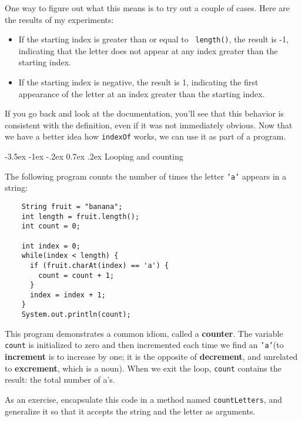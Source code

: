 \documentclass{book}
\makeatletter
\renewcommand{\section}{\@startsection 
    {section} {1} {0mm}%
    {-3.5ex \@plus -1ex \@minus -.2ex}%
    {0.7ex \@plus.2ex}%
    {\normalfont\Large\bfseries}}
\makeatother
\begin{document}
One way to figure out what this means is to try out a couple
of cases.  Here are the results of my experiments:

\begin{itemize}

\item If the starting index is greater than or equal to {\tt
length()}, the result is -1, indicating that the letter
does not appear at any index greater than the starting index.

\item If the starting index is negative, the result is 1,
indicating the first appearance of the letter at an index
greater than the starting index.

\end{itemize}

If you go back and look at the documentation, you'll see that
this behavior is consistent with the definition, even if it
was not immediately obvious.  Now that we have a better idea
how {\tt indexOf} works, we can use it as part of a program.

\section{Looping and counting}
\label{loopcount}

The following program counts the
number of times the letter {\tt 'a'} appears in a string:

\begin{verbatim}
    String fruit = "banana";
    int length = fruit.length();
    int count = 0;

    int index = 0;
    while(index < length) {
      if (fruit.charAt(index) == 'a') {
        count = count + 1;
      }
      index = index + 1;
    }
    System.out.println(count);
\end{verbatim}
%
This program demonstrates a common idiom, called a {\bf counter}.  The
variable {\tt count} is initialized to zero and then incremented each
time we find an {\tt 'a'}(to {\bf increment} is to increase by one;
it is the opposite of {\bf decrement}, and unrelated to {\bf
excrement}, which is a noun).  When we exit the loop, {\tt count}
contains the result: the total number of a's.


As an exercise, encapsulate this code in a method named
{\tt countLetters}, and generalize it so that it accepts the
string and the letter as arguments.
\end{document}
